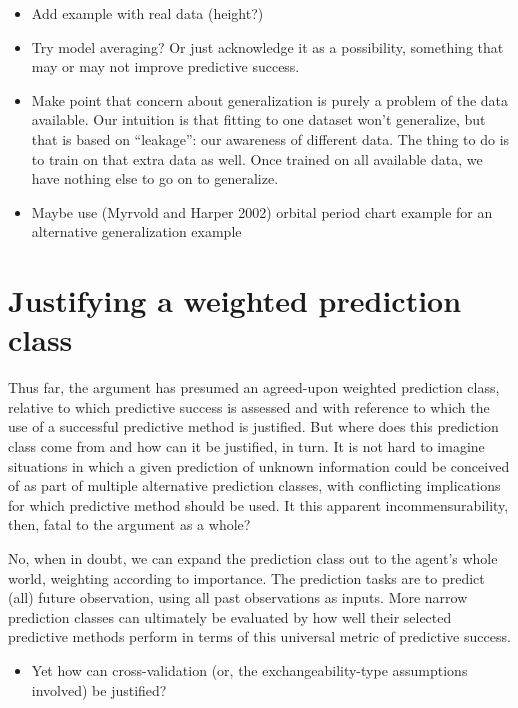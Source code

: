 \documentclass[
  letterpaper,
  DIV=11,
  numbers=noendperiod]{scrartcl}
\providecommand{\tightlist}{%
  \setlength{\itemsep}{0pt}\setlength{\parskip}{0pt}}\usepackage{longtable,booktabs,array}
\theoremstyle{definition}
\theoremstyle{remark}
\begin{document}
\begin{itemize}
\tightlist
\item
  Add example with real data (height?)
\item
  Try model averaging? Or just acknowledge it as a possibility,
  something that may or may not improve predictive success.
\item
  Make point that concern about generalization is purely a problem of
  the data available. Our intuition is that fitting to one dataset won't
  generalize, but that is based on ``leakage'': our awareness of
  different data. The thing to do is to train on that extra data as
  well. Once trained on all available data, we have nothing else to go
  on to generalize.
\item
  Maybe use (Myrvold and Harper 2002) orbital period chart example for
  an alternative generalization example
\end{itemize}

\section{Justifying a weighted prediction class}\label{sec-class}

Thus far, the argument has presumed an agreed-upon weighted prediction
class, relative to which predictive success is assessed and with
reference to which the use of a successful predictive method is
justified. But where does this prediction class come from and how can it
be justified, in turn. It is not hard to imagine situations in which a
given prediction of unknown information could be conceived of as part of
multiple alternative prediction classes, with conflicting implications
for which predictive method should be used. It this apparent
incommensurability, then, fatal to the argument as a whole?

No, when in doubt, we can expand the prediction class out to the agent's
whole world, weighting according to importance. The prediction tasks are
to predict (all) future observation, using all past observations as
inputs. More narrow prediction classes can ultimately be evaluated by
how well their selected predictive methods perform in terms of this
universal metric of predictive success.

\begin{itemize}
\tightlist
\item
  Yet how can cross-validation (or, the exchangeability-type assumptions
  involved) be justified?
\end{itemize}
\end{document}

